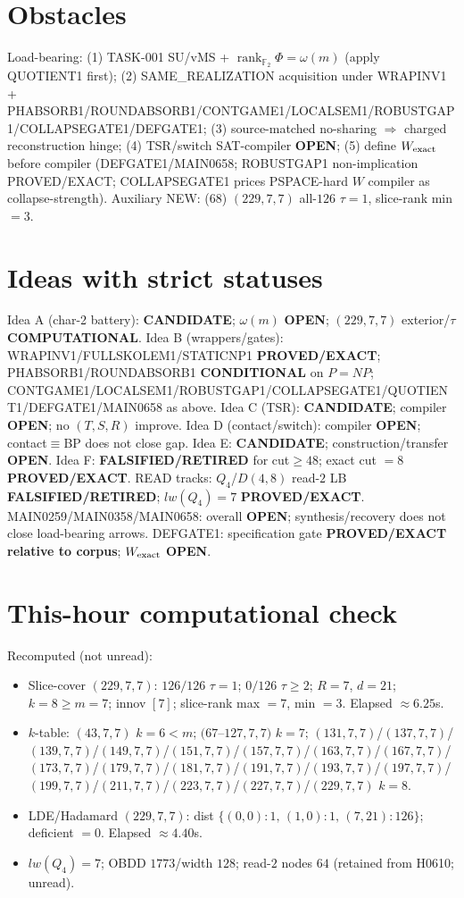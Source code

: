 \documentclass[11pt]{article}
\begin{document}
\section*{Obstacles}
Load-bearing: (1) TASK-001 SU/vMS + $\operatorname{rank}_{\mathbb F_2}\Phi=\omega(m)$ (apply QUOTIENT1 first);
(2) SAME\_REALIZATION acquisition under WRAPINV1 + PHABSORB1/ROUNDABSORB1/CONTGAME1/LOCALSEM1/ROBUSTGAP1/COLLAPSEGATE1/DEFGATE1;
(3) source-matched no-sharing $\Rightarrow$ charged reconstruction hinge;
(4) TSR/switch SAT-compiler \textbf{OPEN};
(5) define $W_{\rm exact}$ before compiler (DEFGATE1/MAIN0658; ROBUSTGAP1 non-implication PROVED/EXACT;
COLLAPSEGATE1 prices PSPACE-hard $W$ compiler as collapse-strength).
Auxiliary NEW: (68) $(229,7,7)$ all-$126$ $\tau{=}1$, slice-rank min $=3$.

\section*{Ideas with strict statuses}
Idea A (char-2 battery): \textbf{CANDIDATE}; $\omega(m)$ \textbf{OPEN}; $(229,7,7)$ exterior/$\tau$ \textbf{COMPUTATIONAL}.
Idea B (wrappers/gates): WRAPINV1/FULLSKOLEM1/STATICNP1 \textbf{PROVED/EXACT};
PHABSORB1/ROUNDABSORB1 \textbf{CONDITIONAL} on $P=NP$;
CONTGAME1/LOCALSEM1/ROBUSTGAP1/COLLAPSEGATE1/QUOTIENT1/DEFGATE1/MAIN0658 as above.
Idea C (TSR): \textbf{CANDIDATE}; compiler \textbf{OPEN}; no $(T,S,R)$ improve.
Idea D (contact/switch): compiler \textbf{OPEN}; contact$\equiv$BP does not close gap.
Idea E: \textbf{CANDIDATE}; construction/transfer \textbf{OPEN}.
Idea F: \textbf{FALSIFIED/RETIRED} for cut$\ge48$; exact cut $=8$ \textbf{PROVED/EXACT}.
READ tracks: $Q_4$/$D(4,8)$ read-$2$ LB \textbf{FALSIFIED/RETIRED}; $lw(Q_4)=7$ \textbf{PROVED/EXACT}.
MAIN0259/MAIN0358/MAIN0658: overall \textbf{OPEN}; synthesis/recovery does not close load-bearing arrows.
DEFGATE1: specification gate \textbf{PROVED/EXACT relative to corpus}; $W_{\rm exact}$ \textbf{OPEN}.

\section*{This-hour computational check}
Recomputed (not unread):
\begin{itemize}
\item Slice-cover $(229,7,7)$: $126/126$ $\tau{=}1$; $0/126$ $\tau{\ge}2$; $R{=}7$, $d{=}21$;
  $k{=}8{\ge}m{=}7$; innov $[7]$; slice-rank max $=7$, min $=3$. Elapsed $\approx6.25$s.
\item $k$-table: $(43,7,7)$ $k{=}6{<}m$; $(67$--$127,7,7)$ $k{=}7$;
  $(131,7,7)$/$(137,7,7)$/$(139,7,7)$/$(149,7,7)$/$(151,7,7)$/$(157,7,7)$/$(163,7,7)$/$(167,7,7)$/$(173,7,7)$/$(179,7,7)$/$(181,7,7)$/$(191,7,7)$/$(193,7,7)$/$(197,7,7)$/$(199,7,7)$/$(211,7,7)$/$(223,7,7)$/$(227,7,7)$/$(229,7,7)$ $k{=}8$.
\item LDE/Hadamard $(229,7,7)$: dist $\{(0,0){:}1,\,(1,0){:}1,\,(7,21){:}126\}$; deficient $=0$. Elapsed $\approx4.40$s.
\item $lw(Q_4)=7$; OBDD $1773$/width $128$; read-$2$ nodes $64$ (retained from H0610; unread).
\end{itemize}
\end{document}
